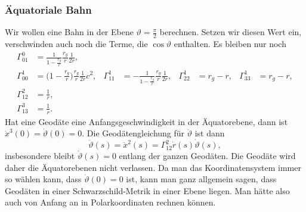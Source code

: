 \subsubsection{Äquatoriale Bahn}
Wir wollen eine Bahn in der Ebene $\vartheta=\frac{\pi}2$ berechnen.
Setzen wir diesen Wert ein, verschwinden auch noch die Terme, die
$\cos\vartheta$ enthalten.
Es bleiben nur noch
\begin{equation}
\begin{aligned}
\Gamma^0_{01}
&=
\frac{1}{1-\displaystyle\frac{r_g}{r}}
\frac{r_g}{r}
\frac{1}{2r},
\\
\Gamma^1_{00}
&=
\biggl(1-\displaystyle\frac{r_g}{r}\biggr)
\frac{r_g}{r}
\frac{1}{2r}c^2,
&
\Gamma^1_{11}
&=
-\frac1{1-\displaystyle\frac{r_g}{r}}
\frac{r_g}{r}
\frac{1}{2r},
&
\Gamma^1_{22}
&=
r_g-r,
&
\Gamma^1_{33}
&=
r_g-r,
\\
\Gamma^2_{12}
&=
\frac1r,
\\
\Gamma^3_{13}
&=
\frac1r.
\end{aligned}
\label{skript:schwarzschild:christoffelaequator}
\end{equation}
Hat eine Geodäte eine Anfangsgeschwindigkeit in der Äquatorebene, dann
ist $\dot x^3(0) = \dot\vartheta(0)=0$.
Die Geodätengleichung für $\ddot \vartheta$ ist dann
\[
\ddot \vartheta(s)
=
\ddot x^2(s)
=
\Gamma^2_{12}\dot r(s)\dot \vartheta(s),
\]
insbesondere bleibt $\dot\vartheta(s)=0$ entlang der ganzen Geodäten.
Die Geodäte wird daher die Äquatorebenen nicht verlassen.
Da man das Koordinatensystem immer so wählen kann, dass $\dot\vartheta(0)=0$
ist, kann man ganz allgemein sagen, dass Geodäten in einer Schwarzschild-Metrik
in einer Ebene liegen.
Man hätte also auch von Anfang an in Polarkoordinaten rechnen können.

